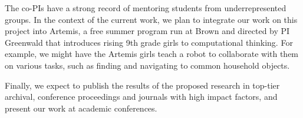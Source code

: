 

The co-PIs have a strong record of mentoring students from
underrepresented groups. In the context of the current work, we plan
to integrate our work on this project into Artemis, a free summer
program run at Brown and directed by PI Greenwald that introduces
rising 9th grade girls to computational thinking.
For example, we might have the Artemis girls teach a robot to
collaborate with them on various tasks, such as finding and navigating
to common household objects.

%

Finally, we expect to publish the results of the proposed research in
top-tier archival, conference proceedings and journals with high
impact factors, and present our work at academic conferences.

